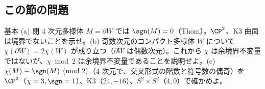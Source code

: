 \subsection*{この節の問題}
\begin{prob}{基本}\label{p:cobord}
(a) 閉 4 次元多様体 $M=\partial W$ では $\sgn(M)=0$（Thom）。$\CP^2$、K3 曲面は境界でないことを示せ。(b) 奇数次元のコンパクト多様体 $W$ について $\chi(\partial W)=2\chi(W)$ が成り立つ（$\partial W$ は偶数次元）。これから $\chi$ は余境界不変量ではないが、$\chi\bmod2$ は余境界不変量であることを説明せよ。(c) $\chi(M)\equiv\sgn(M)\pmod2$（4 次元で、交叉形式の階数と符号数の偶奇）を $\CP^2$（$\chi=3,\sgn=1$）、K3（$24,-16$）、$S^2\times S^2$（$4,0$）で確かめよ。
\end{prob}
